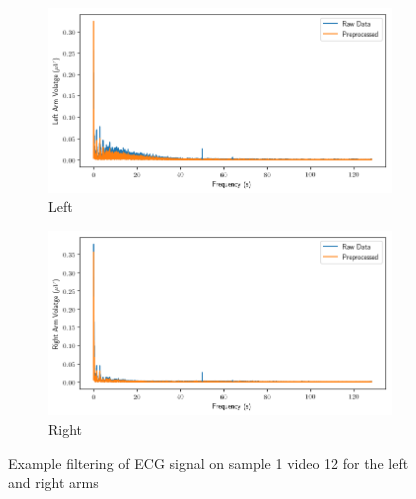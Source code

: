 \begin{figure}[h]
    \begin{subfigure}[t]{\columnwidth}
        \centering
        \includegraphics[width=\columnwidth]{tex/figures/filtering/ECG Left Arm.png}
        \caption{Left}
        \label{fig:filter:left}
    \end{subfigure}
    \hfill
    \begin{subfigure}[t]{\columnwidth}
        \centering
        \includegraphics[width=\columnwidth]{tex/figures/filtering/ECG Right Arm.png}
        \caption{Right}
        \label{fig:filter:right}
    \end{subfigure}
    \caption{Example filtering of ECG signal on sample 1 video 12
             for the left and right arms}
    \label{fig:ecg}


\end{figure}
